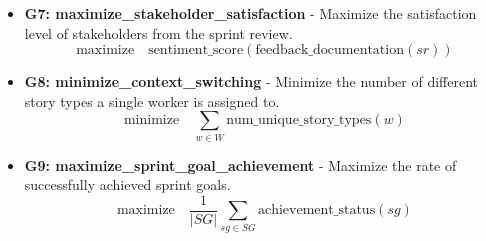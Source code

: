 \documentclass[11pt]{article}
\begin{document}
\begin{itemize}
    \item \textbf{G7: maximize\_stakeholder\_satisfaction} - Maximize the satisfaction level of stakeholders from the sprint review.
        \[ \text{maximize} \quad \text{sentiment\_score}(\text{feedback\_documentation}(sr)) \]

    \item \textbf{G8: minimize\_context\_switching} - Minimize the number of different story types a single worker is assigned to.
        \[ \text{minimize} \quad \sum_{w \in W} \text{num\_unique\_story\_types}(w) \]

    \item \textbf{G9: maximize\_sprint\_goal\_achievement} - Maximize the rate of successfully achieved sprint goals.
        \[ \text{maximize} \quad \frac{1}{|SG|} \sum_{sg \in SG} \text{achievement\_status}(sg) \]
\end{itemize}
\end{document}

